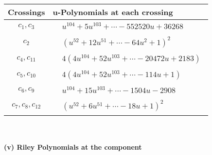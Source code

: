 \documentclass[1p]{elsarticle_modified}
\theoremstyle{definition}
\begin{document}
\begin{tabular}{m{50pt}|m{274pt}}
Crossings & \hspace{64pt}u-Polynomials at each crossing \\
\hline $$\begin{aligned}c_{1},c_{3}\end{aligned}$$&$\begin{aligned}
&u^{104}+5 u^{103}+\cdots-552520 u+36268
\end{aligned}$\\
\hline $$\begin{aligned}c_{2}\end{aligned}$$&$\begin{aligned}
&(u^{52}+12 u^{51}+\cdots-64 u^2+1)^{2}
\end{aligned}$\\
\hline $$\begin{aligned}c_{4},c_{11}\end{aligned}$$&$\begin{aligned}
&4(4 u^{104}+52 u^{103}+\cdots-20472 u+2183)
\end{aligned}$\\
\hline $$\begin{aligned}c_{5},c_{10}\end{aligned}$$&$\begin{aligned}
&4(4 u^{104}+52 u^{103}+\cdots-114 u+1)
\end{aligned}$\\
\hline $$\begin{aligned}c_{6},c_{9}\end{aligned}$$&$\begin{aligned}
&u^{104}+15 u^{103}+\cdots-1504 u-2908
\end{aligned}$\\
\hline $$\begin{aligned}c_{7},c_{8},c_{12}\end{aligned}$$&$\begin{aligned}
&(u^{52}+6 u^{51}+\cdots-18 u+1)^{2}
\end{aligned}$\\
\hline
\end{tabular}\\~\\
\newpage\renewcommand{\arraystretch}{1}
\flushleft \textbf{(v) Riley Polynomials at the component}\newline \\
\end{document}
